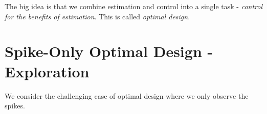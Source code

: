 \documentclass{article}
\begin{document}
The big idea is that we combine estimation  and control into a single task
- {\sl control for the benefits of estimation}. This is called {\sl optimal
design}.


\section{Spike-Only Optimal Design - Exploration}
We consider the challenging case of optimal design where we only observe the
spikes.
\end{document}
